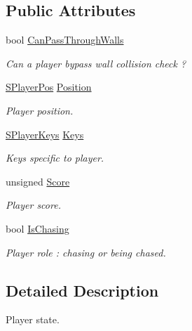 \subsection*{Public Attributes}
\begin{DoxyCompactItemize}
\item 
bool \hyperlink{struct_chase_game_1_1_s_player_state_acd7030969c414605901e551171078bb1}{Can\-Pass\-Through\-Walls}
\begin{DoxyCompactList}\small\item\em Can a player bypass wall collision check ? \end{DoxyCompactList}\item 
\hyperlink{struct_chase_game_1_1_s_player_pos}{S\-Player\-Pos} \hyperlink{struct_chase_game_1_1_s_player_state_a0a68b95a4255f2a543675f88b00847b4}{Position}
\begin{DoxyCompactList}\small\item\em Player position. \end{DoxyCompactList}\item 
\hyperlink{struct_chase_game_1_1_s_player_keys}{S\-Player\-Keys} \hyperlink{struct_chase_game_1_1_s_player_state_a3fc9ce0322ed28ff9c401983d91c69f2}{Keys}
\begin{DoxyCompactList}\small\item\em Keys specific to player. \end{DoxyCompactList}\item 
unsigned \hyperlink{struct_chase_game_1_1_s_player_state_a268594c795a70cf1eb9fe6061bfa57d0}{Score}
\begin{DoxyCompactList}\small\item\em Player score. \end{DoxyCompactList}\item 
bool \hyperlink{struct_chase_game_1_1_s_player_state_a2574de666d4744daefd7824b1c3c809f}{Is\-Chasing}
\begin{DoxyCompactList}\small\item\em Player role \-: chasing or being chased. \end{DoxyCompactList}\end{DoxyCompactItemize}


\subsection{Detailed Description}
Player state. 

